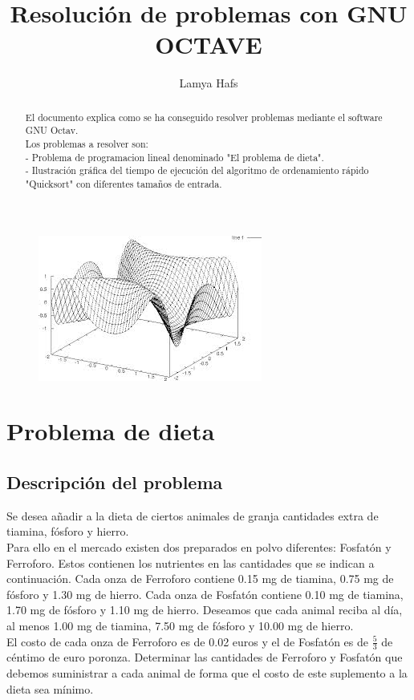 \documentclass[a4,12pt]{article}
\title{Resolución de problemas con GNU OCTAVE}
\author{Lamya Hafs}
\begin{document}
\maketitle
\bigskip
\bigskip
\bigskip
\begin{figure}[H]
  \centering
    \includegraphics{imagenes/octave}
\end{figure}
\newpage

\maketitle

\begin{abstract}
El documento explica como se ha conseguido resolver problemas mediante el software GNU Octav.\\ Los problemas a resolver son:\\
- Problema de programacion lineal denominado "El problema de dieta".\\
- Ilustración gráfica del tiempo de ejecución del algoritmo de ordenamiento rápido "Quicksort" con diferentes tamaños de entrada.\\

\end{abstract}

\tableofcontents
\newpage

\section{Problema de dieta}

\subsection{Descripción del problema}
Se desea añadir a la dieta de ciertos animales de granja cantidades extra de tiamina, fósforo y hierro.\\
Para ello en el mercado existen dos preparados en polvo diferentes: Fosfatón y Ferroforo. Estos
contienen los nutrientes en las cantidades que se indican a continuación. Cada onza de Ferroforo
contiene 0.15 mg de tiamina, 0.75 mg de fósforo y 1.30 mg de hierro. Cada onza de Fosfatón contiene 0.10 mg de tiamina, 1.70 mg de fósforo y 1.10 mg de hierro. Deseamos que cada animal reciba al día, al menos 1.00 mg de tiamina, 7.50 mg de fósforo y 10.00 mg de hierro.\\
El costo de cada onza de Ferroforo es de 0.02 euros y el de Fosfatón es de $\frac{5}{3}$ de céntimo de euro poronza. Determinar las cantidades de Ferroforo y Fosfatón que debemos suministrar a cada animal de forma que el costo de este suplemento a la dieta sea mínimo.\\
\end{document}
